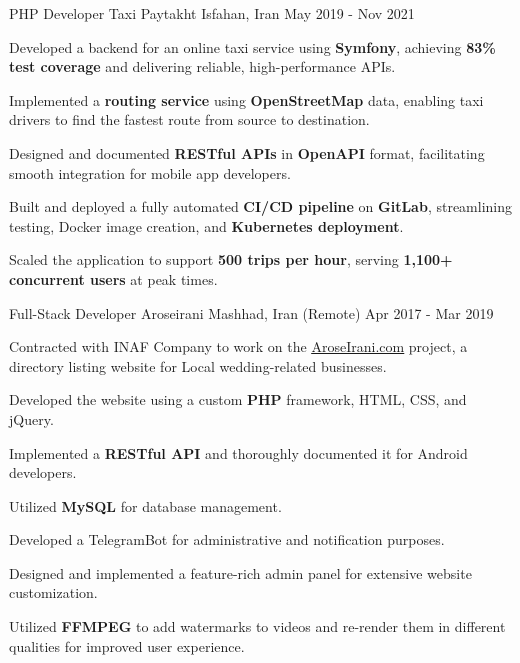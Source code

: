 \begin{cventries}
  \cventry
    {PHP Developer} %
    {Taxi Paytakht} %
    {Isfahan, Iran} %
    {May 2019  - Nov 2021} %
    {
      \begin{cvitems}
        \item {Developed a backend for an online taxi service using \textbf{Symfony}, achieving \textbf{83\% test coverage} and delivering reliable, high-performance APIs.}
        \item {Implemented a \textbf{routing service} using \textbf{OpenStreetMap} data, enabling taxi drivers to find the fastest route from source to destination.}
        \item {Designed and documented \textbf{RESTful APIs} in \textbf{OpenAPI} format, facilitating smooth integration for mobile app developers.}
        \item {Built and deployed a fully automated \textbf{CI/CD pipeline} on \textbf{GitLab}, streamlining testing, Docker image creation, and \textbf{Kubernetes deployment}.}
        \item {Scaled the application to support \textbf{500 trips per hour}, serving \textbf{1,100+ concurrent users} at peak times.}
      \end{cvitems}
    }
  
  \cventry
    {Full-Stack Developer} %
    {Aroseirani} %
    {Mashhad, Iran (Remote)} %
    {Apr 2017 - Mar 2019} %
    {
      \begin{cvitems} %
        \item {Contracted with INAF Company to work on the \href{https://aroseirani.com}{\underline{AroseIrani.com}} project, a directory listing website for Local wedding-related businesses.}
        \item {Developed the website using a custom \textbf{PHP} framework, HTML, CSS, and jQuery.}
        \item {Implemented a \textbf{RESTful API} and thoroughly documented it for Android developers.}
        \item {Utilized \textbf{MySQL} for database management.}
        \item {Developed a TelegramBot for administrative and notification purposes.}
        \item {Designed and implemented a feature-rich admin panel for extensive website customization.}
        \item {Utilized \textbf{FFMPEG} to add watermarks to videos and re-render them in different qualities for improved user experience.}
      \end{cvitems}
    }


\end{cventries}
